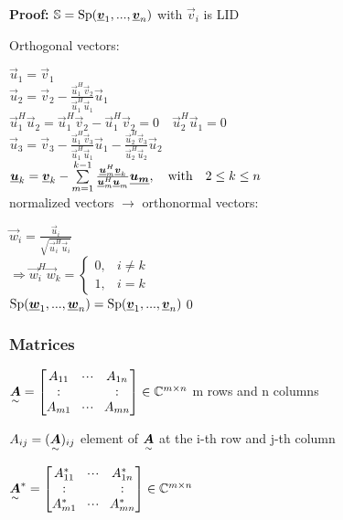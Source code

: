 \textbf{Proof:} $\mathbb{S}=\operatorname{Sp}(\underline{\boldsymbol {v}}_1,...,\underline{\boldsymbol {v}}_n)$ with $\vec{v}_i$ is LID

Orthogonal vectors:

$\vec{u}_1=\vec{v}_1$\\

$\vec{u}_2=\vec{v}_2-\frac{\vec{u}_1^H\vec{v}_2}{\vec{u}_1^H\vec{u}_1}\vec{u}_1 $\\

$\vec{u}_1^H \vec{u}_2 = \vec{u}_1^H \vec{v}_2 - \vec{u}_1^H \vec{v}_2 = 0 \quad \vec{u}_2^H \vec{u}_1 = 0$\\

$\vec{u}_3=\vec{v}_3-\frac{\vec{u}_1^H\vec{v}_3}{\vec{u}_1^H\vec{u}_1}\vec{u}_1-\frac{\vec{u}_2^H\vec{v}_3}{\vec{u}_2^H\vec{u}_2}\vec{u}_2 $\\

$\underline{\boldsymbol {u}}_k=\underline{\boldsymbol {v}}_k-\sum\limits_{m=1}^{k-1}\frac{\underline{\boldsymbol {u}}_m^H\underline{\boldsymbol {v}}_k}{\underline{\boldsymbol {u}}_m^H\underline{\boldsymbol {u}}_m}\underline{\boldsymbol {u_m}}, \quad\textrm{with}\quad 2\leq k\leq n$\\

normalized vectors $\rightarrow$ orthonormal vectors:

$\vec{w}_i=\frac{\vec{u}_i}{\sqrt{\vec{u}_i^H\vec{u}_i}}$ \\
$\Rightarrow \vec{w}_i^H\vec{w}_k=\left\lbrace \begin{matrix}0,&i\neq k\\1,&i=k\end{matrix}  \right.$\\

$\operatorname{Sp}(\underline{\boldsymbol {w}}_1,...,\underline{\boldsymbol {w}}_n)=\operatorname{Sp}(\underline{\boldsymbol {v}}_1,...,\underline{\boldsymbol {v}}_n)$\qed\\ 


\subsubsection{Matrices}
$\ma{A}=\begin{bmatrix}A_{11}&\shdots&A_{1n}\\\svdots& &\svdots\\A_{m1} & \shdots& A_{mn}\end{bmatrix}\in\mathbb{C}^{m\times n}$ \with m rows and n columns

$A_{ij}=(\underset{\sim}{\boldsymbol {A}})_{ij}$ element of $\underset{\sim}{\boldsymbol {A}}$ at the i-th row and j-th column 

$\ma{A}^*=\begin{bmatrix}A_{11}^*&\shdots&A_{1n}^*\\\svdots& &\svdots\\A_{m1}^* & \shdots& A_{mn}^*\end{bmatrix} \in \mathbb{C}^{m\times n}$
 
